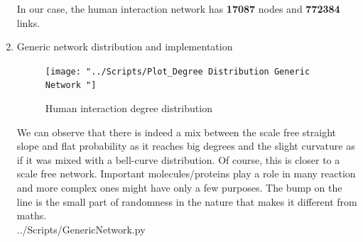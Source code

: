 \documentclass[10pt,a4paper]{article}
\begin{document}
\begin{enumerate}
	In our case, the human interaction network has \textbf{17087} nodes and \textbf{772384} links.
	
	
	\item Generic network distribution and implementation 
	
	
\begin{figure}[H]
	\centering
	\texttt{[image: "../Scripts/Plot\_Degree Distribution Generic Network "]}
	\caption[Human interaction network plot]{Human interaction degree distribution}
	\label{fig:plot4degree-distribution-generic-network-}
\end{figure}
	
	We can observe that there is indeed a mix between the scale free straight slope and flat probability as it reaches big degrees and the slight curvature as if it was mixed with a bell-curve distribution. Of course, this is closer to a scale free network. Important molecules/proteins play a role in many reaction and more complex ones might have only a few purposes. The bump on the line is the small part of randomness in the nature that makes it different from maths. \\
	
	 {../Scripts/GenericNetwork.py}
	
	
	
\end{enumerate}	
	
\end{document}
